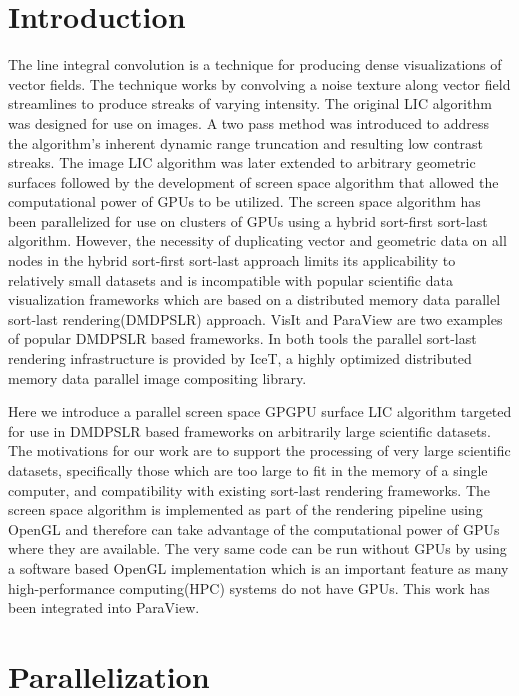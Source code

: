 \documentclass[a4paper,10pt]{article}
\begin{document}
\section{Introduction}
The line integral convolution is a technique for producing dense visualizations of vector fields. The technique works by convolving a noise texture along vector field streamlines to produce streaks of varying intensity. The original LIC algorithm\citep{lic} was designed for use on images. A two pass method was introduced to address the algorithm's inherent dynamic range truncation and resulting low contrast streaks\citep{elic}. The image LIC algorithm was later extended to arbitrary geometric surfaces\citep{surflic} followed by the development of screen space algorithm\citep{gpulic} that allowed the computational power of GPUs to be utilized. The screen space algorithm has been parallelized for use on clusters of GPUs using a hybrid sort-first sort-last algorithm\citep{pargpulic}. However, the necessity of duplicating vector and geometric data on all nodes in the hybrid sort-first sort-last approach limits its applicability to relatively small datasets and is incompatible with popular scientific data visualization frameworks which are based on a distributed memory data parallel  sort-last rendering(DMDPSLR) approach. VisIt \citep{visit} and ParaView \citep{paraview} are two examples of popular DMDPSLR based frameworks. In both tools the parallel sort-last rendering infrastructure is provided by IceT\citep{icet}, a highly optimized distributed memory data parallel image compositing library.

Here we introduce a parallel screen space GPGPU surface LIC algorithm targeted for use in DMDPSLR based frameworks on arbitrarily large scientific datasets. The motivations for our work are to support the processing of very large scientific datasets, specifically those which are too large to fit in the memory of a single computer, and compatibility with existing sort-last rendering frameworks. The screen space algorithm is implemented as part of the rendering pipeline using OpenGL and therefore can take advantage of the computational power of GPUs where they are available. The very same code can be run without GPUs by using a software based OpenGL implementation which is an important feature as many high-performance computing(HPC) systems do not have GPUs. This work has been integrated into ParaView.

\section{Parallelization}
\end{document}
